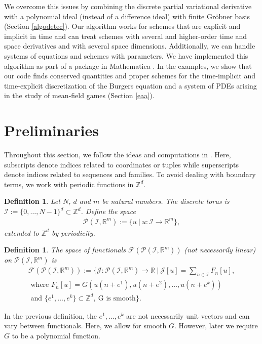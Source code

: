\documentclass[sigconf,twocolumn]{acmart}
\newcommand{\Rr}{{\mathbb{R}}}
\newcommand{\Zz}{{\mathbb{Z}}}
\newcommand{\1}{{\chi}}
\newcommand{\Ii}{{\mathcal{I}}}
\numberwithin{equation}{section}
\theoremstyle{thmlemcorr}
\numberwithin{theorem}{section}
\theoremstyle{thmlemcorr*}
\theoremstyle{defi}
\newtheorem{definition}[theorem]{Definition}
\theoremstyle{remexample}
\theoremstyle{ass}
\begin{document}
We overcome this issues by combining the discrete partial variational derivative with a polynomial ideal (instead of a difference ideal) with finite Gr{\"o}bner basis (Section \ref{algodetec}). 
Our algorithm works for schemes that are explicit and implicit in time and can treat schemes with several and higher-order time  and space derivatives and with several space dimensions.
Additionally, we can handle systems of equations and schemes with parameters. 
We have implemented this algorithm as part of a package in {\sc Mathematica} \cite{wolfram21}.
In the examples, we show that our code finds conserved quantities and proper schemes for the time-implicit and time-explicit discretization of the Burgers equation and a system of PDEs arising in the study of mean-field games (Section \ref{eaa}).

\section{Preliminaries}
\label{assp}
Throughout this section, we follow the ideas and computations in \cite{gomes20}.
Here, subscripts denote indices related to coordinates or tuples while superscripts denote indices related to sequences and families.
To avoid dealing with boundary terms, we work with periodic functions in $\Zz^d$.
\begin{definition}
	Let $N$, $d$ and $m$ be natural numbers. The \emph{discrete torus} is $\Ii:=\{0,\ldots,N-1\}^d\subset \Zz^d$. Define the space
	\begin{gather*}
		\mathcal{P}(\Ii,\Rr^m):=\{u\ |\ u:\Ii\rightarrow\Rr^m\},
	\end{gather*}
	extended to $\Zz^d$ by periodicity.
\end{definition}
\begin{definition}
	The space of functionals $\mathcal{F}(\mathcal{P}(\Ii,\Rr^m))$ (not necessarily linear) on $\mathcal{P}(\Ii,\Rr^m)$ is
\begin{gather*}
	\mathcal{F}(\mathcal{P}(\Ii,\Rr^m)):= \Bigg\{\mathcal{J}:\mathcal{P}(\Ii,\Rr^m)\to \Rr\ \Bigg|\ \mathcal{J}[u]=\sum_{n\in\Ii}F_n[u],\\
	\text{ where }
	F_n[u]=G(u(n+e^1),u(n+e^2),\ldots,u(n+e^k))\\
	\text{ and }\{e^1,\ldots,e^k\}\subset\Zz^d,\ \text{G is smooth}
		\Bigg\}.
\end{gather*}
\end{definition}
In the previous definition, the $e^1,\ldots,e^k$ are not necessarily unit vectors and can vary between functionals. Here, we allow for smooth $G$. However, later we require $G$ to be a polynomial function.
\end{document}
